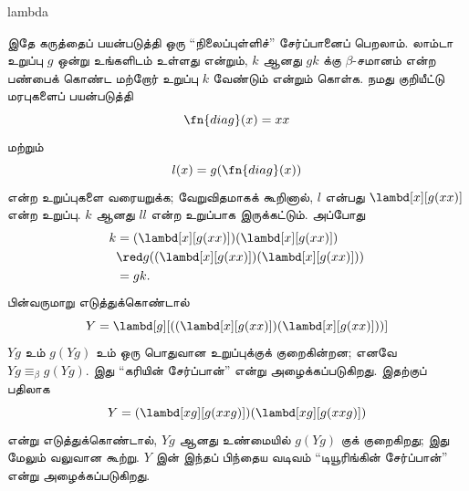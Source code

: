 \documentclass[../../../include/open-logic-section]{subfiles}
\begin{document}
\begin{tagblock}{lambda}
\begin{digress}
இதே கருத்தைப் பயன்படுத்தி ஒரு ``நிலைப்புள்ளிச்'' சேர்ப்பானைப்
பெறலாம். லாம்டா உறுப்பு $g$ ஒன்று உங்களிடம் உள்ளது என்றும்,
$k$ ஆனது $gk$ க்கு $\beta$-சமானம் என்ற பண்பைக் கொண்ட மற்றோர்
உறுப்பு $k$ வேண்டும் என்றும் கொள்க. நமது குறியீட்டு மரபுகளைப்
பயன்படுத்தி
\[
\fn{diag}(x) = xx
\]
மற்றும்
\[
l(x) = g(\fn{diag}(x))
\]
என்ற உறுப்புகளை வரையறுக்க; வேறுவிதமாகக் கூறினால், $l$ என்பது
$\lambd[x][g(xx)]$ என்ற உறுப்பு. $k$ ஆனது $ll$ என்ற உறுப்பாக
இருக்கட்டும். அப்போது
\begin{align*}
k & = (\lambd[x][g(xx)])(\lambd[x][g(xx)]) \\
& \red  g((\lambd[x][g(xx)])(\lambd[x][g(xx)])) \\
& = gk.
\end{align*}
பின்வருமாறு எடுத்துக்கொண்டால்
\[
Y = \lambd[g][((\lambd[x][g(xx)])(\lambd[x][g(xx)]))]
\]
$Yg$ உம் $g(Yg)$ உம் ஒரு பொதுவான உறுப்புக்குக் குறைகின்றன;
எனவே $Yg \equiv_\beta g(Yg)$. இது ``கரியின் சேர்ப்பான்''
என்று அழைக்கப்படுகிறது. இதற்குப் பதிலாக
\[
Y = (\lambd[xg][g(xxg)])(\lambd[xg][g(xxg)])
\]
என்று எடுத்துக்கொண்டால், $Yg$ ஆனது உண்மையில் $g(Yg)$ குக் குறைகிறது;
இது மேலும் வலுவான கூற்று. $Y$ இன் இந்தப் பிந்தைய வடிவம்
``டியூரிங்கின் சேர்ப்பான்'' என்று அழைக்கப்படுகிறது.
\end{digress}
\end{tagblock}
\end{document}

